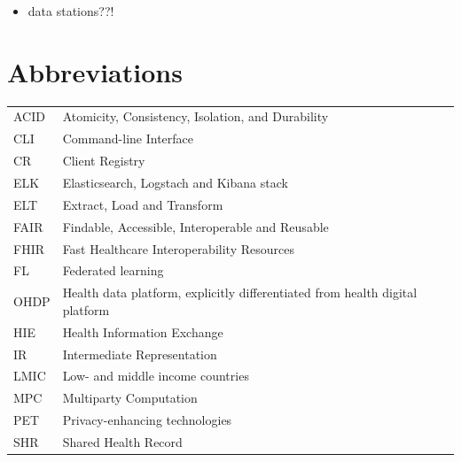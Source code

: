 \documentclass[
  authoryear]{elsarticle}
\providecommand{\tightlist}{%
  \setlength{\itemsep}{0pt}\setlength{\parskip}{0pt}}\usepackage{longtable,booktabs,array}
\begin{document}
\begin{itemize}
\tightlist
\item
  data stations??!
\end{itemize}

\section{Abbreviations}\label{abbreviations}

\begin{longtable}[]{@{}
  >{\raggedright\arraybackslash}p{}
  >{\raggedright\arraybackslash}p{}@{}}
\toprule\noalign{}
\endhead
\bottomrule\noalign{}
\endlastfoot
ACID & Atomicity, Consistency, Isolation, and Durability \\
CLI & Command-line Interface \\
CR & Client Registry \\
ELK & Elasticsearch, Logstach and Kibana stack \\
ELT & Extract, Load and Transform \\
FAIR & Findable, Accessible, Interoperable and Reusable \\
FHIR & Fast Healthcare Interoperability Resources \\
FL & Federated learning \\
OHDP & Health data platform, explicitly differentiated from health
digital platform \\
HIE & Health Information Exchange \\
IR & Intermediate Representation \\
LMIC & Low- and middle income countries \\
MPC & Multiparty Computation \\
PET & Privacy-enhancing technologies \\
SHR & Shared Health Record \\
\end{longtable}


  
\end{document}

